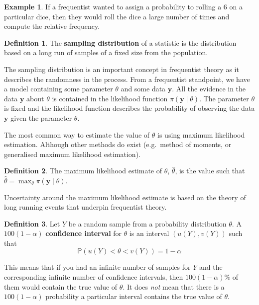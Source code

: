 \documentclass[
]{book}
\theoremstyle{definition}
\newtheorem{definition}{Definition}[chapter]
\theoremstyle{definition}
\newtheorem{example}{Example}[chapter]
\theoremstyle{definition}
\theoremstyle{definition}
\theoremstyle{remark}
\begin{document}
\begin{example}
If a frequentist wanted to assign a probability to rolling a 6 on a particular dice, then they would roll the dice a large number of times and compute the relative frequency.
\end{example}

\begin{definition}
The \textbf{sampling distribution} of a statistic is the distribution based on a long run of samples of a fixed size from the population.
\end{definition}

The sampling distribution is an important concept in frequentist theory as it describes the randomness in the process. From a frequentist standpoint, we have a model containing some parameter \(\theta\) and some data \(\boldsymbol{y}\). All the evidence in the data \(\boldsymbol{y}\) about \(\theta\) is contained in the likelihood function \(\pi(\boldsymbol{y} \mid \theta)\). The parameter \(\theta\) is fixed and the likelihood function describes the probability of observing the data \(\boldsymbol{y}\) given the parameter \(\theta\).

The most common way to estimate the value of \(\theta\) is using maximum likelihood estimation. Although other methods do exist (e.g.~method of moments, or generalised maximum likelihood estimation).

\begin{definition}
The maximum likelihood estimate of \(\theta\), \(\hat{\theta}\), is the value such that \(\hat{\theta} = \max_{\theta} \pi(\boldsymbol{y}\mid \theta)\).
\end{definition}

Uncertainty around the maximum likelihood estimate is based on the theory of long running events that underpin frequentist theory.

\begin{definition}
Let \(Y\) be a random sample from a probability distribution \(\theta\). A \(100(1-\alpha)%
\) \textbf{confidence interval} for \(\theta\) is an interval \((u(Y), v(Y))\) such that
\[
\mathbb{P}(u(Y) < \theta < v(Y)) = 1-\alpha
\]
\end{definition}

This means that if you had an infinite number of samples for \(Y\) and the corresponding infinite number of confidence intervals, then \(100(1-\alpha)\)\% of them would contain the true value of \(\theta\). It does \emph{not} mean that there is a \(100(1-\alpha)\) probability a particular interval contains the true value of \(\theta\).
\end{document}
